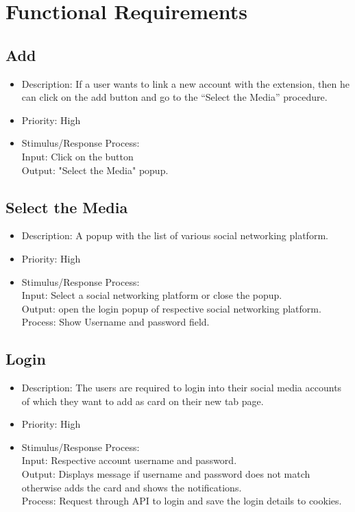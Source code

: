 \documentclass[12pt]{article}
\begin{document}
\section{Functional Requirements}
\subsection{Add}
\begin{itemize}
    \item Description: If a user wants to link a new account with the
extension, then he can click on the add button and go to the
“Select the Media” procedure. 
    \item Priority: High
    \item 
 Stimulus/Response Process:\\
Input: Click on the button\\
Output: "Select the Media" popup.
\end{itemize}

\subsection{Select the Media}
\begin{itemize}
    \item Description: A popup with the list of various social networking
platform.
    \item Priority: High 
    \item Stimulus/Response Process:\\
Input: Select a social networking platform or close the
popup.\\
Output: open the login popup of respective social
networking platform.\\
Process: Show Username and password field.
\end{itemize}

\subsection{Login}
\begin{itemize}
    \item  Description: The users are required to login into their social media
accounts of which they want to add as card on their new tab
page.

    \item Priority: High
    \item Stimulus/Response Process:\\
Input: Respective account username and password.\\
    Output: Displays message if username and
password does not match otherwise adds
the card and shows the notifications.\\

Process: Request through API to login and save the login details to cookies.

 
\end{itemize}
\end{document}
